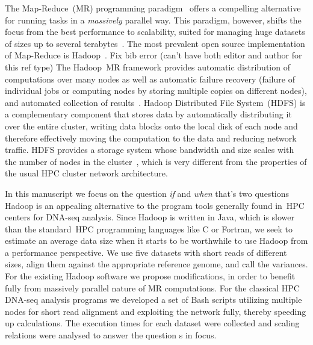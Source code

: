 \documentclass[11pt, oneside]{article}   	%
\newcommand{\COMMENT}[1]{{\color{red} #1 }}
\begin{document}
The Map-Reduce~(MR) programming paradigm~\cite{hadoop} offers a compelling alternative for running tasks in a {\it massively} parallel way. This paradigm, however, shifts the focus from the best performance to scalability, suited for managing huge datasets of sizes up to several terabytes~\cite{lin2010}.
The most prevalent open source implementation of Map-Reduce is Hadoop~\cite{hadoop,Hadoop:Guide}. \COMMENT{Fix bib error (can't have both editor and author for this ref type)} 
The Hadoop~MR framework provides automatic distribution of computations over many nodes as well as automatic failure recovery (failure of individual jobs or computing nodes by storing multiple copies on different nodes), and automated collection of results~\cite{Hadoop:Guide}. Hadoop Distributed File System~(HDFS) is a complementary component that stores data by automatically distributing it over the entire cluster, writing data blocks onto the local disk of each node and therefore effectively moving the computation to the data and reducing network traffic. HDFS provides a storage system whose bandwidth and size scales with the number of nodes in the cluster~\cite{Sammer:2012}, which is very different from the properties of the usual HPC cluster network architecture. 

In this manuscript we focus on the question {\it if} and {\it when} \COMMENT{that's two questions} Hadoop is an appealing alternative to the program tools generally found in~HPC centers for DNA-seq analysis. Since Hadoop is written in Java, which is slower than the standard~HPC programming languages like C or Fortran, we seek to estimate an average data size when it starts to be worthwhile to use Hadoop from a performance perspective. We use five datasets with short reads of different sizes, align them against the appropriate reference genome, and call the variances.
For the existing Hadoop software we propose modifications, in order to benefit fully from massively parallel nature of MR computations. 
For the classical HPC DNA-seq analysis programs we developed a set of Bash scripts utilizing multiple nodes for short read alignment and exploiting the network fully, thereby speeding up calculations.
The execution times for each dataset were collected and scaling relations were analysed to answer the question\COMMENT{s} in focus.
\end{document}
